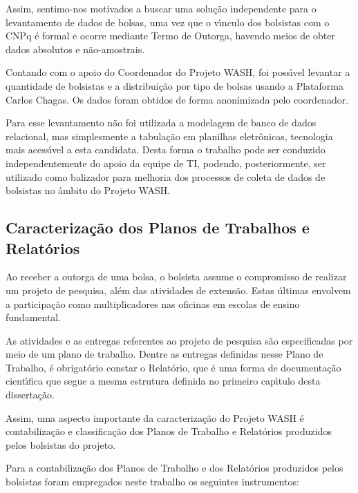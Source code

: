 \documentclass[
12pt,		%
openright,	%
twoside,  %
a4paper,			%
chapter=TITLE,		%
english,			%
french,				%
spanish,			%
brazil				%
]{USPSC-classe/USPSC}
\begin{document}
Assim, sentimo-nos motivados a buscar uma solu\c{c}\~ao independente para o levantamento de dados de bolsas, uma vez que o v\'{\i}nculo dos bolsistas com o CNPq \'e formal e ocorre mediante Termo de Outorga, havendo meios de obter dados absolutos e n\~ao-amostrais.


Contando com o apoio do Coordenador do Projeto WASH, foi poss\'{\i}vel levantar a quantidade de bolsistas e a distribui\c{c}\~ao por tipo de bolsas usando a Plataforma Carlos Chagas. Os dados foram obtidos de forma anonimizada pelo coordenador.


Para esse levantamento n\~ao foi utilizada a modelagem de banco de dados relacional, mas simplesmente a tabula\c{c}\~ao em planilhas eletr\^onicas, tecnologia mais acess\'{\i}vel a esta candidata. Desta forma o trabalho pode ser conduzido independentemente do apoio da equipe de TI, podendo, posteriormente, ser utilizado como balizador para melhoria dos processos de coleta de dados de bolsistas no \^ambito do Projeto WASH.


\subsection[Caracteriza\c{c}\~ao dos Planos de Trabalhos e Relat\'orios]{Caracteriza\c{c}\~ao dos Planos de Trabalhos e Relat\'orios}\label{Caracteriza\c{c}\~ao dos Planos de Trabalhos e Relat\'orios}
Ao receber a outorga de uma bolsa, o bolsista assume o compromisso de realizar um projeto de pesquisa, al\'em das atividades de extens\~ao. Estas \'ultimas envolvem a participa\c{c}\~ao como multiplicadores nas oficinas em escolas de ensino fundamental.


As atividades e as entregas referentes ao projeto de pesquisa s\~ao especificadas por meio de um plano de trabalho. Dentre as entregas definidas nesse Plano de Trabalho, \'e obrigat\'orio constar o Relat\'orio, que \'e uma forma de documenta\c{c}\~ao cient\'{\i}fica que segue a mesma estrutura definida no primeiro cap\'{\i}tulo desta disserta\c{c}\~ao.


Assim, uma aspecto importante da caracteriza\c{c}\~ao do Projeto WASH \'e contabiliza\c{c}\~ao e classifica\c{c}\~ao dos Planos de Trabalho e Relat\'orios produzidos pelos bolsistas do projeto.


Para a contabiliza\c{c}\~ao dos Planos de Trabalho e dos Relat\'orios produzidos pelos bolsistas foram empregados neste trabalho os seguintes instrumentos:
\end{document}
